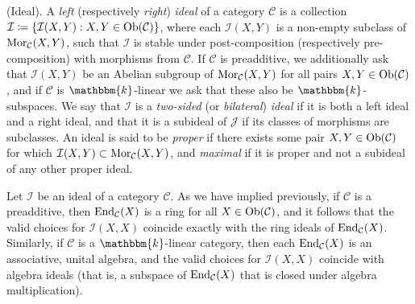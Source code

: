 \noindent\begin{definition}\textnormal{(Ideal).} A {\em left} (respectively {\em right}) {\em ideal} of a category $\mathcal{C}$ is a collection\linebreak $\mathcal{I} \coloneqq \{\mathcal{I}(X, Y) : X, Y \in \textnormal{Ob}(\mathcal{C})\}$, where each $\mathcal{I}(X, Y)$ is a non-empty subclass of $\textnormal{Mor}_\mathcal{C}(X, Y)$, such that $\mathcal{I}$ is stable under post-composition (respectively pre-composition) with morphisms from $\mathcal{C}$. If $\mathcal{C}$ is preadditive, we additionally ask that $\mathcal{I}(X, Y)$ be an Abelian subgroup of $\textnormal{Mor}_\mathcal{C}(X, Y)$ for all pairs $X, Y \in \textnormal{Ob}(\mathcal{C})$, and if $\mathcal{C}$ is $\mathbbm{k}$-linear we ask that these also be $\mathbbm{k}$-subspaces. We say that $\mathcal{I}$ is a {\em two-sided} (or {\em bilateral}) {\em ideal} if it is both a left ideal and a right ideal, and that it is a subideal of $\mathcal{J}$ if its classes of morphisms are subclasses. An ideal is said to be {\em proper} if there exists some pair $X, Y \in \textnormal{Ob}(\mathcal{C})$ for which $\mathcal{I}(X, Y) \subset \textnormal{Mor}_\mathcal{C}(X, Y)$, and {\em maximal} if it is proper and not a subideal of any other proper ideal.\\
\end{definition}

\noindent Let $\mathcal{I}$ be an ideal of a category $\mathcal{C}$. As we have implied previously, if $\mathcal{C}$ is a preadditive, then $\textnormal{End}_\mathcal{C}(X)$ is a ring for all $X \in \textnormal{Ob}(\mathcal{C})$, and it follows that the valid choices for $\mathcal{I}(X, X)$ coincide exactly with the ring ideals of $\textnormal{End}_\mathcal{C}(X)$. Similarly, if $\mathcal{C}$ is a $\mathbbm{k}$-linear category, then each $\textnormal{End}_\mathcal{C}(X)$ is an associative, unital algebra, and the valid choices for $\mathcal{I}(X, X)$ coincide with algebra ideals (that is, a subspace of $\textnormal{End}_\mathcal{C}(X)$ that is closed under algebra multiplication).\\

